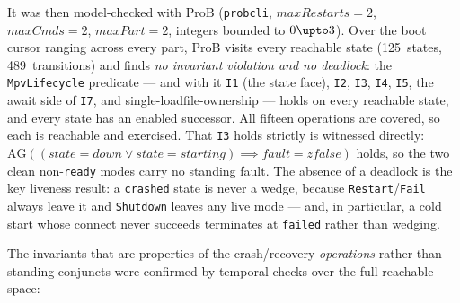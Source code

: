 \documentclass[a4paper,10pt,fleqn]{article}
\begin{document}
It was then model-checked with ProB (\texttt{probcli}, $maxRestarts = 2$,
$maxCmds = 2$, $maxPart = 2$, integers bounded to $0 \upto 3$). Over the boot
cursor ranging across every part, ProB visits every reachable state
(125~states, 489~transitions) and finds \emph{no invariant violation and no
deadlock}: the \texttt{MpvLifecycle} predicate --- and with it \texttt{I1}
(the state face), \texttt{I2}, \texttt{I3}, \texttt{I4}, \texttt{I5}, the await
side of \texttt{I7}, and single-loadfile-ownership --- holds on every reachable
state, and every state has an enabled successor. All fifteen operations are
covered, so each is reachable and exercised. That \texttt{I3} holds strictly is
witnessed directly: $\mathrm{AG}((state = down \lor state = starting) \implies
fault = zfalse)$ holds, so the two clean non-\texttt{ready} modes carry no
standing fault. The absence of a deadlock is the key liveness result: a
\texttt{crashed} state is never a wedge, because \texttt{Restart}/\texttt{Fail}
always leave it and \texttt{Shutdown} leaves any live mode --- and, in
particular, a cold start whose connect never succeeds terminates at
\texttt{failed} rather than wedging.

The invariants that are properties of the crash/recovery \emph{operations}
rather than standing conjuncts were confirmed by temporal checks over the full
reachable space:
\end{document}
